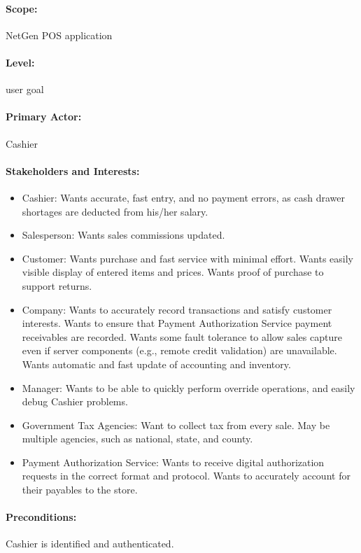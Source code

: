 \documentclass[11pt]{report}
\begin{document}
\paragraph{Scope:} NetGen POS application

\paragraph{Level:} user goal

\paragraph{Primary Actor:} Cashier

\paragraph{Stakeholders and Interests:}
\begin{itemize}
\item Cashier: Wants accurate, fast entry, and no payment errors, as
  cash drawer shortages are deducted from his/her salary.
\item Salesperson: Wants sales commissions updated.
\item Customer: Wants purchase and fast service with minimal effort.
  Wants easily visible display of entered items and prices.  Wants
  proof of purchase to support returns.
\item Company: Wants to accurately record transactions and satisfy
  customer interests.  Wants to ensure that Payment Authorization
  Service payment receivables are recorded.  Wants some fault
  tolerance to allow sales capture even if server components (e.g.,
  remote credit validation) are unavailable.  Wants automatic and fast
  update of accounting and inventory.
\item Manager: Wants to be able to quickly perform override
  operations, and easily debug Cashier problems.
\item Government Tax Agencies: Want to collect tax from every sale.
  May be multiple agencies, such as national, state, and county.
\item Payment Authorization Service: Wants to receive digital
  authorization requests in the correct format and protocol.  Wants to
  accurately account for their payables to the store.
\end{itemize}

\paragraph{Preconditions:} Cashier is identified and authenticated.
\end{document}
